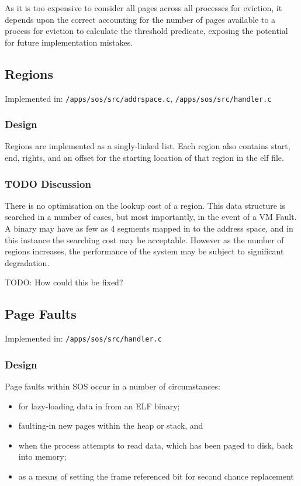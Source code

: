 \documentclass[a4paper,12pt]{article}
\begin{document}
As it is too expensive to consider all pages across all processes for
eviction, it depends upon the correct accounting for the number of pages
available to a process for eviction to calculate the threshold predicate,
exposing the potential for future implementation mistakes.

\subsection{Regions}
Implemented in: \texttt{/apps/sos/src/addrspace.c}, \texttt{/apps/sos/src/handler.c}

\subsubsection{Design}
Regions are implemented as a singly-linked list.  Each region also contains
start, end, rights, and an offset for the starting location of that region in
the elf file.

\subsubsection{TODO Discussion}
There is no optimisation on the lookup cost of a region.  This data structure
is searched in a number of cases, but most importantly, in the event of a VM
Fault.  A binary may have as few as 4 segments mapped in to the address space,
and in this instance the searching cost may be acceptable.  However as the
number of regions increases, the performance of the system may be subject to
significant degradation.

TODO: How could this be fixed?

\subsection{Page Faults}
Implemented in: \texttt{/apps/sos/src/handler.c}

\subsubsection{Design}
Page faults within SOS occur in a number of circumstances:

\begin{itemize}
\item for lazy-loading data in from an ELF binary;
\item faulting-in new pages within the heap or stack, and
\item when the process attempts to read data, which has been paged to disk, back into memory;
\item as a means of setting the frame referenced bit for second chance replacement
\end{itemize}
\end{document}
